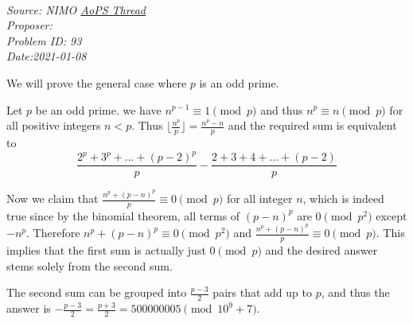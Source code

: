 \SSbreak\\
\emph{Source: NIMO \href{https://artofproblemsolving.com/community/q1h1182685p5731709}{AoPS Thread}}\\
\emph{Proposer: \Pchan}\\
\emph{Problem ID: 93}\\
\emph{Date:2021-01-08}\\
\SSbreak

\bigskip

\begin{solution}\hfil\medskip

We will prove the general case where $p$ is an odd prime.

Let $p$ be an odd prime. we have $n^{p-1} \equiv 1 \pmod{p}$ and thus $n^p \equiv n \pmod{p}$ for all positive integers $n < p$. Thus $\lfloor \frac{n^p}{p}\rfloor = \frac{n^p - n}{p}$ and the required sum is equivalent to \[\frac{2^p + 3^p + ... + (p-2)^p}{p} - \frac{2 + 3 + 4+... + (p-2)}{p}\]

Now we claim that $\frac{n^p + (p-n)^p}{p} \equiv 0 \pmod{p}$ for all integer $n$, which is indeed true since by the binomial theorem, all terms of $(p-n)^p$  are $0 \pmod{p^2}$ except $-n^p$. Therefore $n^p + (p-n)^p \equiv 0 \pmod{p^2}$ and $\frac{n^p + (p-n)^p}{p} \equiv 0 \pmod{p}$.
This implies that the first sum is actually just $0 \pmod{p}$ and the desired answer stems solely from the second sum.

The second sum can be grouped into $\frac{p-3}{2}$ pairs that add up to $p$, and thus the answer is $- \frac{p-3}{2} = \frac{p+3}{2} = \boxed{500000005} \pmod{10^9 +7}$.
\end{solution}
